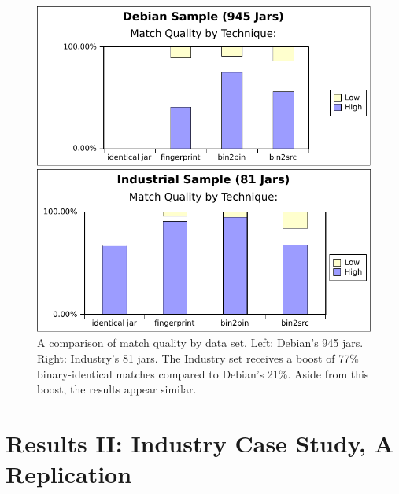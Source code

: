 \begin{figure}[ht]
    \begin{minipage}[b]{0.5\linewidth}
        \centering
        \includegraphics[width=\columnwidth]{plots/debianMatchQuality.pdf}
    \end{minipage}
    \hspace{0.5cm}
    \begin{minipage}[b]{0.5\linewidth}
        \centering
        \includegraphics[width=\columnwidth]{plots/industryMatchQuality.pdf}
    \end{minipage}
    \vspace{-2mm}
    \caption{A comparison of match quality by data set.  Left: Debian's 945
    jars.  Right: Industry's 81 jars.  The Industry set receives a boost of
    77\% binary-identical matches compared to Debian's 21\%.  Aside from
    this boost, the results appear similar.}
    \label{fig:matchQuality}
\end{figure}


\section{Results II:  Industry Case Study, A Replication}

